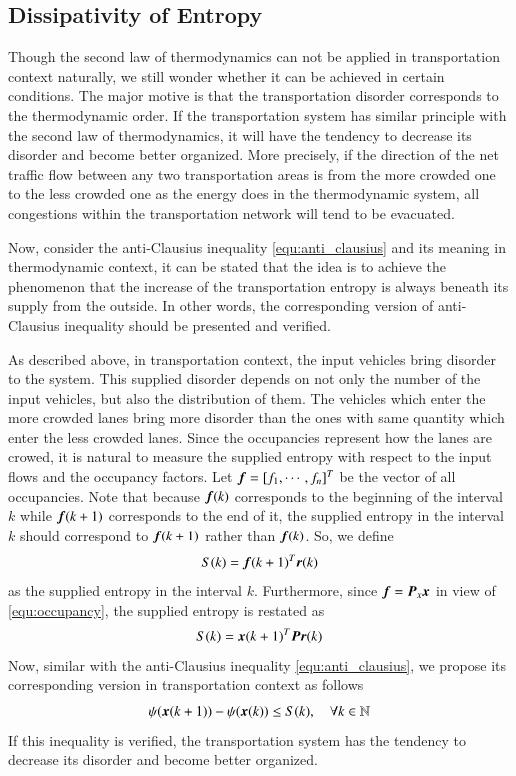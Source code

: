 \documentclass[preprint,authoryear,12pt]{elsarticle}
\renewcommand{\vec}[1]{\mbox{\boldmath$#1$}}
\newcommand{\mat}[1]{\mbox{\boldmath$#1$}}
\begin{document}
\subsection{Dissipativity of Entropy}

Though the second law of thermodynamics can not be applied in transportation context naturally, we still wonder whether it can be achieved in certain conditions. The major motive is that the transportation disorder corresponds to the thermodynamic order. If the transportation system has similar principle with the second law of thermodynamics, it will have the tendency to decrease its disorder and become better organized. More precisely, if the direction of the net traffic flow between any two transportation areas is from the more crowded one to the less crowded one as the energy does in the thermodynamic system, all congestions within the transportation network will tend to be evacuated.

Now, consider the anti-Clausius inequality \eqref{equ:anti_clausius} and its meaning in thermodynamic context, it can be stated that the idea is to achieve the phenomenon that the increase of the transportation entropy is always beneath its supply from the outside. In other words, the corresponding version of anti-Clausius inequality should be presented and verified.

As described above, in transportation context, the input vehicles bring disorder to the system. This supplied disorder depends on not only the number of the input vehicles, but also the distribution of them. The vehicles which enter the more crowded lanes bring more disorder than the ones with same quantity which enter the less crowded lanes. Since the occupancies represent how the lanes are crowed, it is natural to measure the supplied entropy with respect to the input flows and the occupancy factors. Let $\vec{f}=[f_1,\cdots,f_n]^T$ be the vector of all occupancies. Note that because $\vec{f}(k)$ corresponds to the beginning of the interval $k$ while $\vec{f}(k+1)$ corresponds to the end of it, the supplied entropy in the interval $k$ should correspond to $\vec{f}(k+1)$ rather than $\vec{f}(k)$. So, we define
$$S(k)=\vec{f}(k+1)^T\vec{r}(k)$$
as the supplied entropy in the interval $k$. Furthermore, since $\vec{f}=\mat{P}_x\vec{x}$ in view of \eqref{equ:occupancy}, the supplied entropy is restated as
\begin{equation}\label{equ:supply}
    S(k)=\vec{x}(k+1)^T \mat{P} \vec{r}(k)
\end{equation}
Now, similar with the anti-Clausius inequality \eqref{equ:anti_clausius}, we propose its corresponding version in transportation context as follows
\begin{equation}\label{equ:dissipative}
\psi(\vec{x}(k+1))-\psi(\vec{x}(k)) \leq S(k),\quad \forall
k\in\mathbb{N}
\end{equation}
If this inequality is verified, the transportation system has the tendency to decrease its disorder and become better organized.
\end{document}
